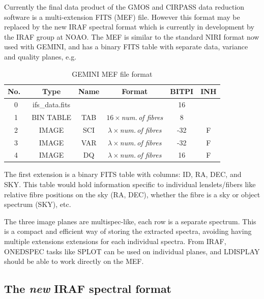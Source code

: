 \documentclass[twoside,11pt]{article}
\newcommand{\htmladdnormallink}[2]{#1}
\newcommand{\htmlref}[2]{#1}
\newcommand{\xlabel}[1]{}
\begin{document}
Currently the final data product of the \htmlref{GMOS}{sc16_gmos} and \htmlref{CIRPASS}{sc16_cirpass} data reduction software is a multi-extension \htmladdnormallink{FITS}{http://fits.gsfc.nasa.gov/} (MEF) file. However this format may be replaced by the new \htmlref{IRAF spectral format}{sc16_iraf} which is currently in development by the IRAF group at NOAO. The MEF is similar to the standard NIRI format now used with GEMINI, and has a binary FITS table with separate data, variance and quality planes, e.g.

\begin{table}[h]
\begin{center}
\begin{tabular}{cccccc}
No.\ & Type  & Name & Format & BITPI & INH\\\hline 
0    &  ifs\_data.fits &  &          &      16 & \\
1  &  BIN TABLE &  TAB  &    $16 \times${\em num.\,of fibres}    &   8    & \\    
2 & IMAGE & SCI & $\lambda \times${\em num.\,of fibres} &  -32   &  F  \\
3  &  IMAGE  &  VAR  &  $\lambda \times${\em num.\,of fibres}  & -32  & F   \\
4  &  IMAGE & DQ & $\lambda \times${\em num.\,of fibres}   &   16     &  F  \\ \hline
\end{tabular}
\caption{GEMINI MEF file format}
\end{center}
\protect\label{tab:mef_file}
\end{table} 

The first extension is a binary FITS table with columns: ID, RA, DEC, and SKY. This table would hold information specific to individual lenslets/fibers like relative fibre positions on the sky (RA, DEC), whether the fibre is a sky or object spectrum (SKY), etc.

The three image planes are multispec-like, each row is a separate spectrum. This is a compact and efficient way of storing the extracted spectra, avoiding having multiple extensions extensions for each individual spectra. From IRAF, ONEDSPEC tasks like SPLOT can be used on individual planes, and LDISPLAY should be able to work directly on the MEF. 

\subsection{\xlabel{sc16_iraf}The {\em new} IRAF spectral format\label{sc16_iraf}}
\end{document}
